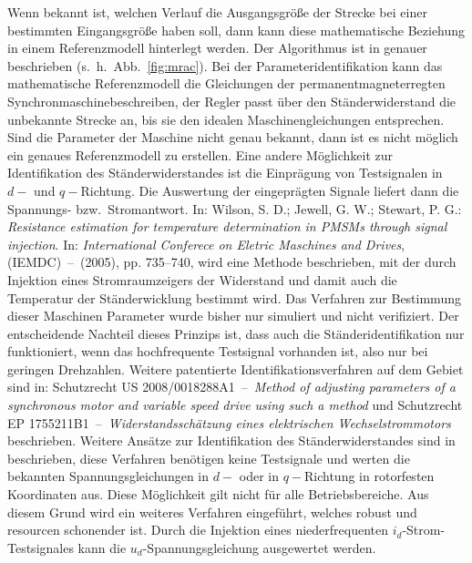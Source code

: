 \documentclass[conference,twocolumn]{IEEEtran}
\newcommand{\pmsm}{permanentmagneterregten Synchronmaschine}
\begin{document}
Wenn bekannt ist, welchen Verlauf die Ausgangsgröße der Strecke bei einer bestimmten Eingangsgröße haben soll, dann kann diese mathematische Beziehung in einem Referenzmodell hinterlegt werden.
Der Algorithmus ist in \autocite{slotine_applied_1991} genauer beschrieben (s.~h.~Abb.~\ref{fig:mrac}).
Bei der Parameteridentifikation kann das mathematische Referenzmodell die Gleichungen der \pmsm beschreiben, der Regler passt über den Ständerwiderstand die unbekannte Strecke an, bis sie den idealen Maschinengleichungen entsprechen.
Sind die Parameter der Maschine nicht genau bekannt, dann ist es nicht möglich ein genaues Referenzmodell zu erstellen.
Eine andere Möglichkeit zur Identifikation des Ständerwiderstandes ist die Einprägung von Testsignalen in $d-$ und $q-$Richtung.
Die Auswertung der eingeprägten Signale liefert dann die Spannungs- bzw.\ Stromantwort.
In: Wilson, S. D.; Jewell, G. W.; Stewart, P. G.: \emph{Resistance estimation for temperature determination in PMSMs through signal injection}. In: \emph{International Conferece on Eletric Maschines and Drives},(IEMDC)~--~(2005), pp. 735--740, wird eine Methode beschrieben, mit der durch Injektion eines Stromraumzeigers der Widerstand und damit auch die Temperatur der Ständerwicklung bestimmt wird.
Das Verfahren zur Bestimmung dieser Maschinen Parameter wurde bisher nur simuliert und nicht verifiziert.
Der entscheidende Nachteil dieses Prinzips ist, dass auch die Ständeridentifikation nur funktioniert, wenn das hochfrequente Testsignal vorhanden ist, also nur bei geringen Drehzahlen.
Weitere patentierte Identifikationsverfahren auf dem Gebiet sind in: Schutzrecht US 2008/0018288A1~--~\emph{Method of adjusting parameters
of a synchronous motor and variable speed drive using such a method} und Schutzrecht EP 1755211B1~--~\emph{Widerstandsschätzung eines elektrischen
Wechselstrommotors} beschrieben.
Weitere Ansätze zur Identifikation des Ständerwiderstandes sind in \textcite{Kellner2012} beschrieben, diese Verfahren benötigen keine Testsignale und werten die bekannten Spannungsgleichungen in $d-$ oder in $q-$Richtung in rotorfesten Koordinaten aus.
Diese Möglichkeit gilt nicht für alle Betriebsbereiche. 
Aus diesem Grund wird ein weiteres Verfahren eingeführt, welches robust und resourcen schonender ist.
Durch die Injektion eines niederfrequenten $i_d$-Strom-Testsignales kann die $u_d$-Spannungsgleichung ausgewertet werden.
\end{document}

